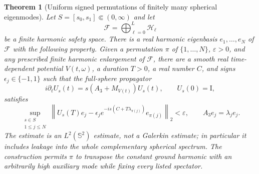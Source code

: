 \documentclass[11pt]{article}
\newtheorem{theorem}{Theorem}[section]
\theoremstyle{remark}
\newcommand{\Id}{\mathrm I}
\begin{document}
\begin{theorem}[Uniform signed permutations of finitely many spherical
eigenmodes]
\label{thm:sphere-multiwell-permutation}
Let $S=[s_0,s_1]\Subset(0,\infty)$ and let
\[
 \mathcal F=\bigoplus_{\ell=0}^{L}\mathcal H_\ell
\]
be a finite harmonic safety space.  There is a real harmonic eigenbasis
$e_1,\ldots,e_N$ of $\mathcal F$ with the following property.  Given a
permutation $\pi$ of $\{1,\ldots,N\}$, $\varepsilon>0$, and any prescribed
finite harmonic enlargement of $\mathcal F$, there are a smooth real
time-dependent potential $V(t,\omega)$, a duration $T>0$, a real number
$C$, and signs $\epsilon_j\in\{-1,1\}$ such that the full-sphere propagator
\[
 i\partial_tU_s(t)=s(A_3+M_{V(t)})U_s(t),\qquad U_s(0)=\Id ,
\]
satisfies
\begin{equation}
 \sup_{\substack{s\in S\\1\leq j\leq N}}
 \left\|
 U_s(T)e_j-
 \epsilon_j e^{-is(C+T\lambda_{\pi(j)})}e_{\pi(j)}
 \right\|_2<\varepsilon ,
 \qquad A_3e_j=\lambda_je_j .
 \label{eq:uniform-signed-sphere-permutation}
\end{equation}
The estimate is an $L^2(\mathbb S^2)$ estimate, not a Galerkin estimate;
in particular it includes leakage into the whole complementary spherical
spectrum.  The construction permits $\pi$ to transpose the constant ground
harmonic with an arbitrarily high auxiliary mode while fixing every listed
spectator.
\end{theorem}
\end{document}
